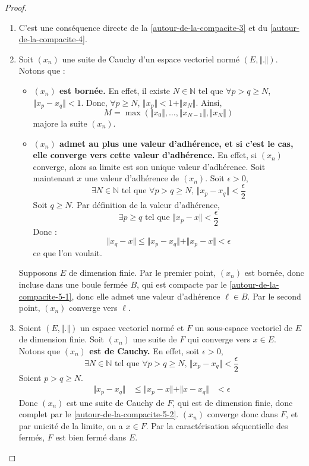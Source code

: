 	\begin{proof}
		\begin{enumerate}[label=(\roman*)]
			\item C'est une conséquence directe de la \cref{autour-de-la-compacite-3} et du \cref{autour-de-la-compacite-4}.
			\item Soit $(x_n)$ une suite de Cauchy d'un espace vectoriel normé $(E, \Vert . \Vert)$. Notons que :
			\begin{itemize}
				\item \textbf{$(x_n)$ est bornée.} En effet, il existe $N \in \mathbb{N}$ tel que $\forall p > q \geq N$, $\Vert x_p - x_q \Vert < 1$. Donc, $\forall p \geq N$, $\Vert x_p \Vert < 1 + \Vert x_N \Vert$. Ainsi,
				\[ M = \max(\Vert x_0 \Vert, \dots, \Vert x_{N-1} \Vert, \Vert x_N \Vert) \]
				majore la suite $(x_n)$.
				\item \textbf{$(x_n)$ admet au plus une valeur d'adhérence, et si c'est le cas, elle converge vers cette valeur d'adhérence.} En effet, si $(x_n)$ converge, alors sa limite est son unique valeur d'adhérence. Soit maintenant $x$ une valeur d'adhérence de $(x_n)$. Soit $\epsilon > 0$,
				\[ \exists N \in \mathbb{N} \text{ tel que } \forall p > q \geq N, \, \Vert x_p - x_q \Vert < \frac{\epsilon}{2} \]
				Soit $q \geq N$. Par définition de la valeur d'adhérence,
				\[ \exists p \geq q \text{ tel que } \Vert x_p - x \Vert < \frac{\epsilon}{2} \]
				Donc :
				\[ \Vert x_q - x \Vert \leq \Vert x_p - x_q \Vert + \Vert x_p - x \Vert < \epsilon \]
				ce que l'on voulait.
			\end{itemize}
			Supposons $E$ de dimension finie. Par le premier point, $(x_n)$ est bornée, donc incluse dans une boule fermée $B$, qui est compacte par le \cref{autour-de-la-compacite-5-1}, donc elle admet une valeur d'adhérence $\ell \in B$. Par le second point, $(x_n)$ converge vers $\ell$.
			\item Soient $(E, \Vert . \Vert)$ un espace vectoriel normé et $F$ un sous-espace vectoriel de $E$ de dimension finie. Soit $(x_n)$ une suite de $F$ qui converge vers $x \in E$. Notons que \textbf{$(x_n)$ est de Cauchy.} En effet, soit $\epsilon > 0$,
			\[ \exists N \in \mathbb{N} \text{ tel que } \forall p > q \geq N, \, \Vert x_p - x_q \Vert < \frac{\epsilon}{2} \]
			Soient $p > q \geq N$.
			\begin{align*}
				\Vert x_p - x_q \Vert &\leq \Vert x_p - x \Vert + \Vert x - x_q \Vert
				&< \epsilon
			\end{align*}
			Donc $(x_n)$ est une suite de Cauchy de $F$, qui est de dimension finie, donc complet par le \cref{autour-de-la-compacite-5-2}. $(x_n)$ converge donc dans $F$, et par unicité de la limite, on a $x \in F$. Par la caractérisation séquentielle des fermés, $F$ est bien fermé dans $E$.

\end{enumerate}
\end{proof}
